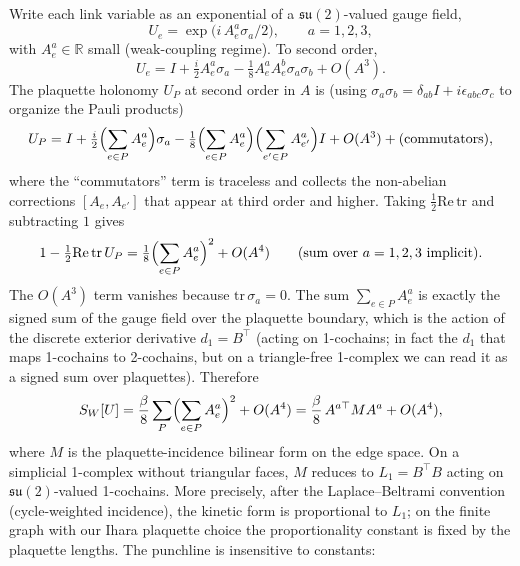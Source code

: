 \documentclass[11pt]{article}
\begin{document}
Write each link variable as an exponential of a
$\mathfrak{su}(2)$-valued gauge field,
\begin{equation}
U_e = \exp\bigl(i\, A_e^{a} \sigma_a / 2\bigr),
\qquad a = 1, 2, 3,
\label{eq:link_exponential}
\end{equation}
with $A_e^{a} \in \mathbb{R}$ small (weak-coupling regime).  To second
order,
\begin{equation}
U_e = I + \tfrac{i}{2} A_e^{a} \sigma_a - \tfrac{1}{8} A_e^{a} A_e^{b}
\sigma_a \sigma_b + O(A^3).
\label{eq:link_expansion}
\end{equation}
The plaquette holonomy $U_P$ at second order in $A$ is (using
$\sigma_a \sigma_b = \delta_{ab} I + i \epsilon_{abc} \sigma_c$ to
organize the Pauli products)
\begin{equation}
U_P = I + \tfrac{i}{2}\Bigl(\sum_{e \in P} A_e^{a}\Bigr) \sigma_a
- \tfrac{1}{8}\Bigl(\sum_{e \in P} A_e^{a}\Bigr)\Bigl(\sum_{e' \in P}
  A_{e'}^{a}\Bigr) I + O(A^3) + (\text{commutators}),
\label{eq:plaquette_expansion}
\end{equation}
where the ``commutators'' term is traceless and collects the
non-abelian corrections $[A_e, A_{e'}]$ that appear at third order
and higher.  Taking $\tfrac{1}{2} \mathrm{Re}\,\mathrm{tr}$ and
subtracting $1$ gives
\begin{equation}
1 - \tfrac{1}{2}\mathrm{Re}\,\mathrm{tr}\,U_P
= \tfrac{1}{8}\Bigl(\sum_{e \in P} A_e^{a}\Bigr)^2 + O(A^4)
\qquad (\text{sum over }a = 1, 2, 3 \text{ implicit}).
\label{eq:plaquette_quadratic}
\end{equation}
The $O(A^3)$ term vanishes because $\mathrm{tr}\,\sigma_a = 0$.  The
sum $\sum_{e \in P} A_e^{a}$ is exactly the signed sum of the gauge
field over the plaquette boundary, which is the action of the
discrete exterior derivative $d_1 = B^{\top}$ (acting on 1-cochains;
in fact the $d_1$ that maps 1-cochains to 2-cochains, but on a
triangle-free 1-complex we can read it as a signed sum over
plaquettes).  Therefore
\begin{equation}
S_W[U] = \frac{\beta}{8} \sum_P \Bigl(\sum_{e \in P} A_e^{a}\Bigr)^2
+ O(A^4)
= \frac{\beta}{8}\, A^{a\top} M A^{a} + O(A^4),
\label{eq:wilson_quadratic}
\end{equation}
where $M$ is the plaquette-incidence bilinear form on the edge
space.  On a simplicial 1-complex without triangular faces, $M$
reduces to $L_1 = B^{\top} B$ acting on
$\mathfrak{su}(2)$-valued 1-cochains.  More precisely, after the
Laplace--Beltrami convention (cycle-weighted incidence), the kinetic
form is proportional to $L_1$; on the finite graph with our Ihara
plaquette choice the proportionality constant is fixed by the plaquette
lengths.  The punchline is insensitive to constants:
\end{document}
